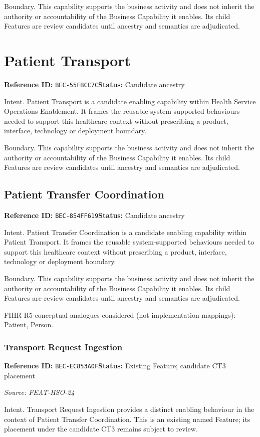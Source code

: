 \documentclass[11pt,a4paper,openany]{book}
\begin{document}
Boundary. This capability supports the business activity and does not inherit the authority or accountability of the Business Capability it enables. Its child Features are review candidates until ancestry and semantics are adjudicated.

\section{Patient Transport}\label{cap:bec-55fbcc7c}
\noindent\textbf{Reference ID:} \texttt{BEC-55FBCC7C}\quad \textbf{Status:} Candidate ancestry\par
Intent. Patient Transport is a candidate enabling capability within Health Service Operations Enablement. It frames the reusable system-supported behaviours needed to support this healthcare context without prescribing a product, interface, technology or deployment boundary.

Boundary. This capability supports the business activity and does not inherit the authority or accountability of the Business Capability it enables. Its child Features are review candidates until ancestry and semantics are adjudicated.

\subsection{Patient Transfer Coordination}\label{cap:bec-854ff619}
\noindent\textbf{Reference ID:} \texttt{BEC-854FF619}\quad \textbf{Status:} Candidate ancestry\par
Intent. Patient Transfer Coordination is a candidate enabling capability within Patient Transport. It frames the reusable system-supported behaviours needed to support this healthcare context without prescribing a product, interface, technology or deployment boundary.

Boundary. This capability supports the business activity and does not inherit the authority or accountability of the Business Capability it enables. Its child Features are review candidates until ancestry and semantics are adjudicated.

FHIR R5 conceptual analogues considered (not implementation mappings): Patient, Person.

\subsubsection{Transport Request Ingestion}\label{cap:bec-ec853a0f}
\noindent\textbf{Reference ID:} \texttt{BEC-EC853A0F}\quad \textbf{Status:} Existing Feature; candidate CT3 placement\par
\noindent\textit{Source: FEAT-HSO-24}\par
Intent. Transport Request Ingestion provides a distinct enabling behaviour in the context of Patient Transfer Coordination. This is an existing named Feature; its placement under the candidate CT3 remains subject to review.
\end{document}
